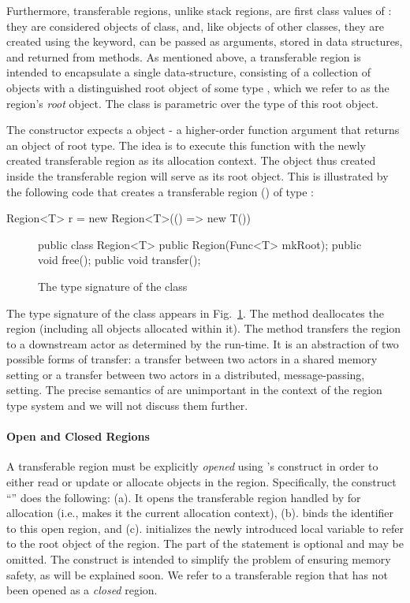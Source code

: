 Furthermore, transferable regions, unlike stack regions, are first class values of \name:
they are considered objects of  class, and, like objects of other
classes, they are created using the  keyword, can be passed as
arguments, stored in data structures, and returned from methods.
As mentioned above, a transferable region is intended to encapsulate a single
data-structure, consisting of a collection of objects with a distinguished root
object of some type , which we refer to as the region's \emph{root} object.
The class  is parametric over the type  of this root object.

The  constructor expects a 
object - a higher-order function argument that returns an object of
root type.  The idea is to execute this function with the newly
created transferable region as its allocation context. The object thus
created inside the transferable region will serve as its root object.
This is illustrated by the following code that creates a transferable region
() of type :
\begin{codejava}
  Region<T> r = new Region<T>(() => new T())
\end{codejava}


\begin{figure}
\begin{codejava}
  public class Region<T> {
    public Region(Func<T> mkRoot);
    public void free();
    public void transfer();
  }
\end{codejava}
\caption{The type signature of the  class}
\label{fig:region-class}
\end{figure}

The type signature of the class  appears in Fig.~\ref{fig:region-class}.
The method  deallocates the region (including all objects allocated within it).
The method  transfers the region to a downstream actor as determined by the run-time.
It is an abstraction of two possible forms of  transfer: a transfer between two actors in a shared
memory setting or a transfer between two actors in a distributed, message-passing, setting. 
The precise semantics of  are unimportant in the context of the region type
system and we will not discuss them further.

\paragraph{Open and Closed Regions}
A transferable region must be explicitly \emph{opened} using \name's  construct
in order to either read or update or allocate objects in the region.
Specifically, the construct ``'' does the following:
(a). It opens the transferable region handled by  for allocation
(i.e., makes it the current allocation context),
(b). binds the identifier  to this open region, and
(c). initializes the newly introduced local variable  to refer
to the root object of the region.
The  part of the statement is optional and may be omitted.
The  construct is intended to simplify the problem of ensuring memory safety,
as will be explained soon.
We refer to a transferable region that has not been opened as a \emph{closed} region.

